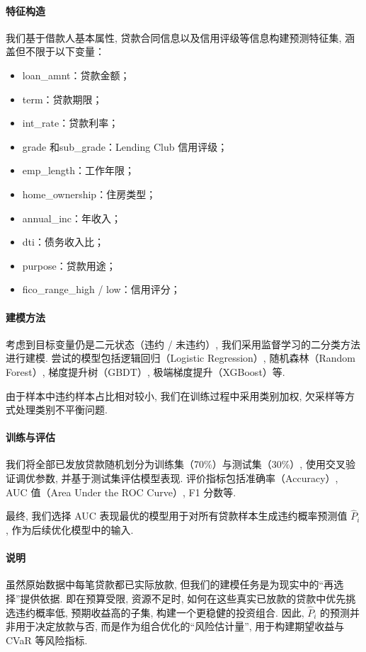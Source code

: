 \documentclass{write_paper}
\begin{document}
\paragraph{特征构造}
我们基于借款人基本属性, 贷款合同信息以及信用评级等信息构建预测特征集, 涵盖但不限于以下变量：

\begin{itemize}
  \item{loan\_amnt}：贷款金额；
  \item{term}：贷款期限；
  \item{int\_rate}：贷款利率；
  \item{grade} 和{sub\_grade}：Lending Club 信用评级；
  \item{emp\_length}：工作年限；
  \item{home\_ownership}：住房类型；
  \item{annual\_inc}：年收入；
  \item{dti}：债务收入比；
  \item{purpose}：贷款用途；
  \item{fico\_range\_high / low}：信用评分；
\end{itemize}

\paragraph{建模方法}
考虑到目标变量仍是二元状态（违约 / 未违约）, 我们采用监督学习的二分类方法进行建模. 尝试的模型包括逻辑回归（Logistic Regression）, 随机森林（Random Forest）, 梯度提升树（GBDT）, 极端梯度提升（XGBoost）等. 

由于样本中违约样本占比相对较小, 我们在训练过程中采用类别加权, 欠采样等方式处理类别不平衡问题. 

\paragraph{训练与评估}

我们将全部已发放贷款随机划分为训练集（70\%）与测试集（30\%）, 使用交叉验证调优参数, 并基于测试集评估模型表现. 评价指标包括准确率（Accuracy）, AUC 值（Area Under the ROC Curve）, F1 分数等. 

最终, 我们选择 AUC 表现最优的模型用于对所有贷款样本生成违约概率预测值 $\hat{P}_i$, 作为后续优化模型中的输入. 

\paragraph{说明}
虽然原始数据中每笔贷款都已实际放款, 但我们的建模任务是为现实中的“再选择”提供依据. 即在预算受限, 资源不足时, 如何在这些真实已放款的贷款中优先挑选违约概率低, 预期收益高的子集, 构建一个更稳健的投资组合. 因此, $\hat{P}_i$ 的预测并非用于决定放款与否, 而是作为组合优化的“风险估计量”, 用于构建期望收益与 CVaR 等风险指标. 
\end{document}

